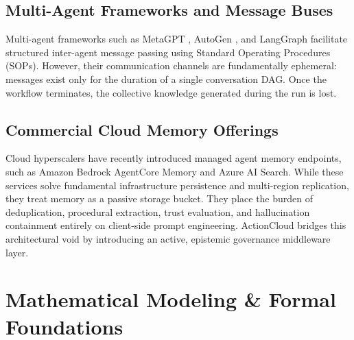 \documentclass[lettersize,journal]{IEEEtran}
\begin{document}
\subsection{Multi-Agent Frameworks and Message Buses}
Multi-agent frameworks such as MetaGPT \cite{hong2023metagpt}, AutoGen \cite{wu2023autogen}, and LangGraph facilitate structured inter-agent message passing using Standard Operating Procedures (SOPs). However, their communication channels are fundamentally ephemeral: messages exist only for the duration of a single conversation DAG. Once the workflow terminates, the collective knowledge generated during the run is lost.

\subsection{Commercial Cloud Memory Offerings}
Cloud hyperscalers have recently introduced managed agent memory endpoints, such as Amazon Bedrock AgentCore Memory and Azure AI Search. While these services solve fundamental infrastructure persistence and multi-region replication, they treat memory as a passive storage bucket. They place the burden of deduplication, procedural extraction, trust evaluation, and hallucination containment entirely on client-side prompt engineering. ActionCloud bridges this architectural void by introducing an active, epistemic governance middleware layer.

\section{Mathematical Modeling \& Formal Foundations}
\end{document}
